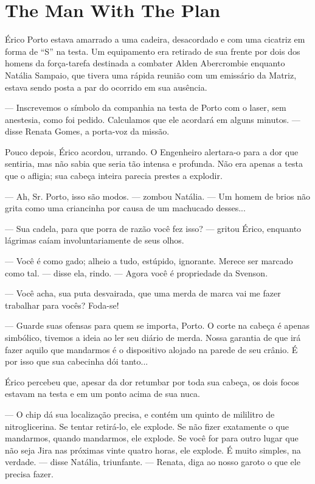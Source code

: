 \chapter{The Man With The Plan}


Érico Porto estava amarrado a uma cadeira, desacordado e com uma
cicatriz em forma de “S” na testa. Um equipamento era retirado de sua
frente por dois dos homens da força-tarefa destinada a combater Alden
Abercrombie enquanto Natália Sampaio, que tivera uma rápida reunião com
um emissário da Matriz, estava sendo posta a par do ocorrido em sua
ausência.

--- Inscrevemos o símbolo da companhia na testa de Porto com o laser,
sem anestesia, como foi pedido. Calculamos que ele acordará em alguns
minutos. --- disse Renata Gomes, a porta-voz da missão.

Pouco depois, Érico acordou, urrando. O Engenheiro alertara-o para a dor
que sentiria, mas não sabia que seria tão intensa e profunda. Não era
apenas a testa que o afligia; sua cabeça inteira parecia prestes a
explodir.

--- Ah, Sr. Porto, isso são modos. --- zombou Natália. --- Um homem de
brios não grita como uma criancinha por causa de um machucado desses...

--- Sua cadela, para que porra de razão você fez isso? --- gritou Érico,
enquanto lágrimas caíam involuntariamente de seus olhos.

--- Você é como gado; alheio a tudo, estúpido, ignorante. Merece ser
marcado como tal. --- disse ela, rindo. --- Agora você é propriedade da
Svenson.

--- Você acha, sua puta desvairada, que uma merda de marca vai me fazer
trabalhar para vocês? Foda-se!

--- Guarde suas ofensas para quem se importa, Porto. O corte na cabeça é
apenas simbólico, tivemos a ideia ao ler seu diário de merda. Nossa
garantia de que irá fazer aquilo que mandarmos é o dispositivo alojado
na parede de seu crânio. É por isso que sua cabecinha dói tanto...

Érico percebeu que, apesar da dor retumbar por toda sua cabeça, os dois
focos estavam na testa e em um ponto acima de sua nuca.

--- O chip dá sua localização precisa, e contém um quinto de mililitro
de nitroglicerina. Se tentar retirá-lo, ele explode. Se não fizer
exatamente o que mandarmos, quando mandarmos, ele explode. Se você for
para outro lugar que não seja Jira nas próximas vinte quatro horas, ele
explode. É muito simples, na verdade. --- disse Natália, triunfante. ---
Renata, diga ao nosso garoto o que ele precisa fazer.

